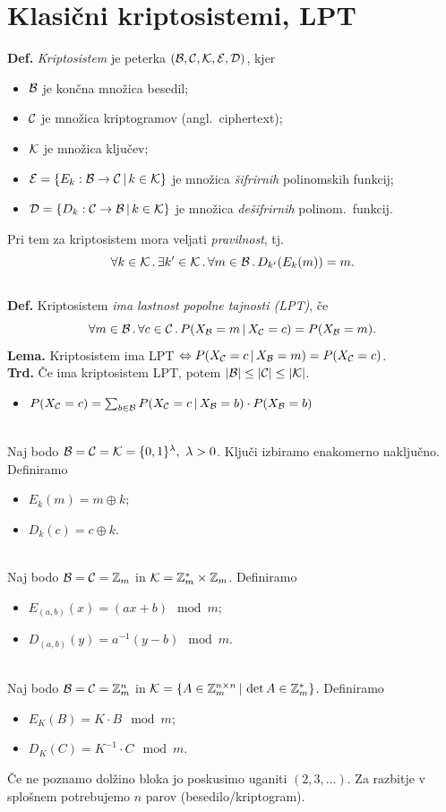 \section{Klasični kriptosistemi, LPT}
\textbf{Def.}
\emph{Kriptosistem} je peterka \((\mathcal{B}, \mathcal{C}, \mathcal{K}, \mathcal{E}, \mathcal{D})\), kjer
\begin{itemize}
    \item \(\mathcal{B}\) je končna množica besedil;
    \item \(\mathcal{C}\) je množica kriptogramov (angl.\ ciphertext);
    \item \(\mathcal{K}\) je množica ključev;
    \item \(\mathcal{E} = \{E_k: \mathcal{B} \to \mathcal{C} \,|\, k \in \mathcal{K}\}\) je množica \emph{šifrirnih} polinomskih funkcij;
    \item \(\mathcal{D} = \{D_k: \mathcal{C} \to \mathcal{B} \,|\, k \in \mathcal{K}\}\) je množica \emph{dešifrirnih} polinom.\ funkcij.
\end{itemize}
Pri tem za kriptosistem mora veljati \emph{pravilnost}, tj.\
\[
    \forall k \in \mathcal{K} \,.\, \exists k' \in \mathcal{K} \,.\, \forall m \in \mathcal{B} \,.\, D_{k'}(E_k(m)) = m.
\]
%
\\
\textbf{Def.} Kriptosistem \emph{ima lastnost popolne tajnosti (LPT)}, če 
    \[
        \forall m \in \mathcal{B} \,.\, \forall c \in \mathcal{C} \,.\, P(X_{\mathcal{B}} = m\, |\, X_{\mathcal{C}} = c) = P(X_{\mathcal{B}} = m).
    \]
\textbf{Lema.} Kriptosistem ima LPT \(\Leftrightarrow P(X_{\mathcal{C}} = c\, |\, X_{\mathcal{B}} = m) = P(X_{\mathcal{C}} = c)\).\\
\textbf{Trd.} Če ima kriptosistem LPT, potem \(|\mathcal{B}| \leq |\mathcal{C}| \leq |\mathcal{K}|\).\\
\begin{itemize}
    \item \(P(X_{\mathcal{C}} = c) = \sum_{b \in \mathcal{B}}P(X_{\mathcal{C}} = c \,|\, X_{\mathcal{B}} = b) \cdot P(X_{\mathcal{B}} = b)\)
\end{itemize}
\\
Naj bodo \(\B = \CC = \K = \set{0, 1}^\lambda,\ \lambda > 0\). Ključi izbiramo enakomerno naključno. Definiramo 
\begin{itemize}
    \item \(E_k(m) = m \oplus k\); 
    \item \(D_k(c) = c \oplus k\).
\end{itemize}
\\
Naj bodo \(\mathcal{B} = \mathcal{C} = \mathbb{Z}_m\) in \(\mathcal{K} = \mathbb{Z}_m^* \times \mathbb{Z}_m\). Definiramo
\begin{itemize}
    \item \(E_{(a, b)}(x) = (ax + b) \mod m\);
    \item \(D_{(a, b)}(y) = a^{-1}(y - b) \mod m\).
\end{itemize}
\\
Naj bodo \(\mathcal{B} = \mathcal{C} = \mathbb{Z}_m^n\) in \(\mathcal{K} = \{A \in \mathbb{Z}_m^{n \times n} \,|\, \det A \in \mathbb{Z}_m^*\}\). Definiramo
\begin{itemize}
    \item \(E_K(B) = K \cdot B \mod m\);
    \item \(D_K(C) = K^{-1} \cdot C \mod m\).
\end{itemize}
Če ne poznamo dolžino bloka jo poskusimo uganiti \((2, 3, \ldots)\). Za razbitje v splošnem potrebujemo \(n\) parov (besedilo/kriptogram).
